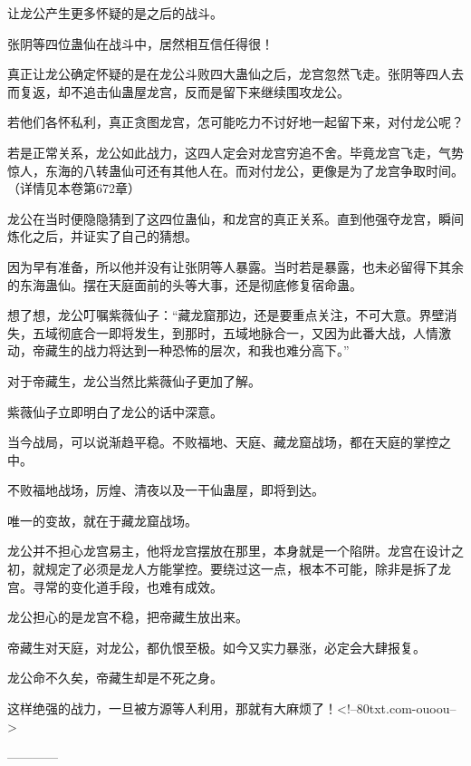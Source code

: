 \begin{this_body}
让龙公产生更多怀疑的是之后的战斗。

张阴等四位蛊仙在战斗中，居然相互信任得很！

真正让龙公确定怀疑的是在龙公斗败四大蛊仙之后，龙宫忽然飞走。张阴等四人去而复返，却不追击仙蛊屋龙宫，反而是留下来继续围攻龙公。

若他们各怀私利，真正贪图龙宫，怎可能吃力不讨好地一起留下来，对付龙公呢？

若是正常关系，龙公如此战力，这四人定会对龙宫穷追不舍。毕竟龙宫飞走，气势惊人，东海的八转蛊仙可还有其他人在。而对付龙公，更像是为了龙宫争取时间。（详情见本卷第672章）

龙公在当时便隐隐猜到了这四位蛊仙，和龙宫的真正关系。直到他强夺龙宫，瞬间炼化之后，并证实了自己的猜想。

因为早有准备，所以他并没有让张阴等人暴露。当时若是暴露，也未必留得下其余的东海蛊仙。摆在天庭面前的头等大事，还是彻底修复宿命蛊。

想了想，龙公叮嘱紫薇仙子：“藏龙窟那边，还是要重点关注，不可大意。界壁消失，五域彻底合一即将发生，到那时，五域地脉合一，又因为此番大战，人情激动，帝藏生的战力将达到一种恐怖的层次，和我也难分高下。”

对于帝藏生，龙公当然比紫薇仙子更加了解。

紫薇仙子立即明白了龙公的话中深意。

当今战局，可以说渐趋平稳。不败福地、天庭、藏龙窟战场，都在天庭的掌控之中。

不败福地战场，厉煌、清夜以及一干仙蛊屋，即将到达。

唯一的变故，就在于藏龙窟战场。

龙公并不担心龙宫易主，他将龙宫摆放在那里，本身就是一个陷阱。龙宫在设计之初，就规定了必须是龙人方能掌控。要绕过这一点，根本不可能，除非是拆了龙宫。寻常的变化道手段，也难有成效。

龙公担心的是龙宫不稳，把帝藏生放出来。

帝藏生对天庭，对龙公，都仇恨至极。如今又实力暴涨，必定会大肆报复。

龙公命不久矣，帝藏生却是不死之身。

这样绝强的战力，一旦被方源等人利用，那就有大麻烦了！<!--80txt.com-ouoou-->

------------

\end{this_body}

